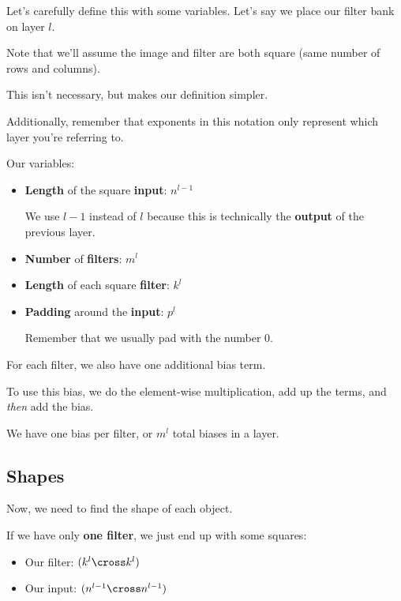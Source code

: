         Let's carefully define this with some variables. Let's say we place our filter bank on layer $l$. 
        
        Note that we'll assume the image and filter are both square (same number of rows and columns). 
        
        This isn't necessary, but makes our definition simpler.
        
        Additionally, remember that exponents in this notation only represent which layer you're referring to.
        
        Our variables:
        
        \begin{itemize}
            \item \textbf{Length} of the square \textbf{input}: $n^{l-1}$
            
            We use $l-1$ instead of $l$ because this is technically the \textbf{output} of the previous layer.
        
            \item \textbf{Number} of \textbf{filters}: $m^l$
            
            \item \textbf{Length} of each square \textbf{filter}: $k^l$
            
            \item \textbf{Padding} around the \textbf{input}: $p^l$
            
            Remember that we usually pad with the number 0.
        \end{itemize}
        
        For each filter, we also have one additional bias term. 
        
        To use this bias, we do the element-wise multiplication, add up the terms, and \textit{then} add the bias.
        
        We have one bias per filter, or $m^l$ total biases in a layer.
        
    
    \subsection{Shapes}
        
        Now, we need to find the shape of each object.
        
        If we have only \textbf{one filter}, we just end up with some squares:
        
        \begin{itemize}
            \item  Our filter: $(k^l \cross k^l)$
            \item  Our input: $(n^{l-1} \cross n^{l-1})$
        \end{itemize}

